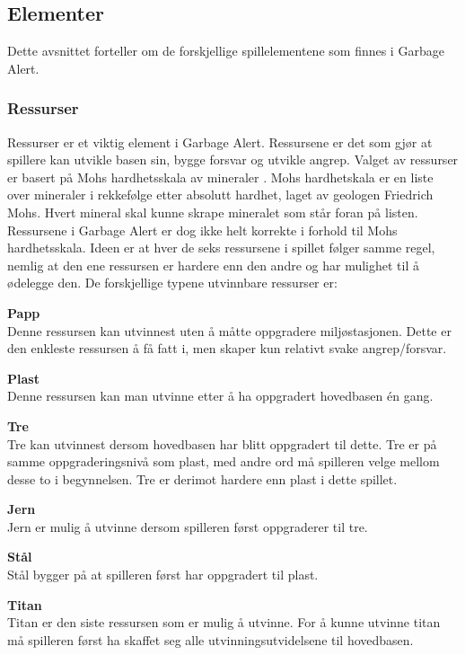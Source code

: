 




\subsection{Elementer} \label{sec:spillelement}
Dette avsnittet forteller om de forskjellige spillelementene som finnes
i Garbage Alert.

\subsubsection{Ressurser}
Ressurser er et viktig element i Garbage Alert. Ressursene er det som
gjør at spillere kan utvikle basen sin, bygge forsvar og utvikle angrep.
Valget av ressurser er basert på Mohs hardhetsskala av mineraler \cite{mohs}. Mohs hardhetskala er en liste over mineraler i rekkefølge etter absolutt hardhet, laget av geologen Friedrich Mohs. Hvert mineral skal kunne skrape mineralet som står foran på listen. Ressursene i Garbage Alert er dog ikke helt korrekte i forhold til Mohs hardhetsskala. Ideen er at hver de seks ressursene i spillet følger samme regel, nemlig at den ene ressursen er hardere enn den andre og har mulighet til å ødelegge den. 
De forskjellige typene utvinnbare ressurser er:

\begin{description}
	\item \textbf{Papp}\\ Denne ressursen kan utvinnest uten å måtte oppgradere miljøstasjonen. Dette er den enkleste ressursen å få fatt i, men skaper kun relativt svake angrep/forsvar.
	\item \textbf{Plast}\\ Denne ressursen kan man utvinne etter å ha oppgradert hovedbasen én gang.
	\item \textbf{Tre}\\ Tre kan utvinnest dersom hovedbasen har blitt oppgradert til dette. Tre er på samme oppgraderingsnivå som plast, med andre ord må spilleren velge mellom desse to i begynnelsen. Tre er derimot hardere enn plast i dette spillet.
	\item \textbf{Jern}\\ Jern er mulig å utvinne dersom spilleren først oppgraderer til tre.
	\item \textbf{Stål}\\ Stål bygger på at spilleren først har oppgradert til plast.
	\item \textbf{Titan}\\ Titan er den siste ressursen som er mulig å utvinne. For å kunne utvinne titan må spilleren først ha skaffet seg alle utvinningsutvidelsene til hovedbasen.
\end{description}


